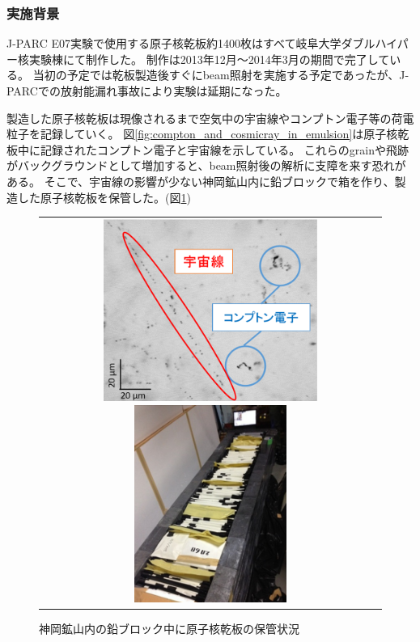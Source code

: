 \documentclass[12pt,a4paper]{jarticle}
\begin{document}
\subsubsection{実施背景}
J-PARC E07実験で使用する原子核乾板約1400枚はすべて岐阜大学ダブルハイパー核実験棟にて制作した。
制作は2013年12月～2014年3月の期間で完了している。
当初の予定では乾板製造後すぐにbeam照射を実施する予定であったが、J-PARCでの放射能漏れ事故により実験は延期になった。
\par
製造した原子核乾板は現像されるまで空気中の宇宙線やコンプトン電子等の荷電粒子を記録していく。
図\ref{fig:compton_and_cosmicray_in_emulsion}は原子核乾板中に記録されたコンプトン電子と宇宙線を示している。
これらのgrainや飛跡がバックグラウンドとして増加すると、beam照射後の解析に支障を来す恐れがある。
そこで、宇宙線の影響が少ない神岡鉱山内に鉛ブロックで箱を作り、製造した原子核乾板を保管した。(図\ref{fig:emulsion_in_Kamioka})
\begin{figure}[htbp]
  \centering
      \begin{tabular}{c}
        \begin{minipage}{0.5\hsize}
          \centering
            \includegraphics[clip, width=70mm]{compton_cosmiclay.png}
            \hspace{1.6cm} 
            \caption{乾板に記録されたコンプトン電子と宇宙線の飛跡\label{fig:compton_and_cosmicray_in_emulsion}}
        \end{minipage}
        
        \begin{minipage}{0.5\hsize}
          \centering
            \includegraphics[clip, width=50mm]{emulsion_in_Kamioka.png}
            \hspace{1.6cm} 
            \caption{神岡鉱山内の鉛ブロック中に原子核乾板の保管状況\label{fig:emulsion_in_Kamioka}}
        \end{minipage}
      \end{tabular}
\end{figure}
\end{document}

